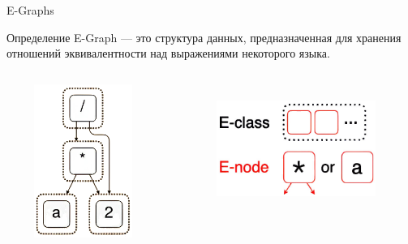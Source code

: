 \documentclass[aspectratio=169
  , xcolor={svgnames}
  , russian  %
  ]{beamer}
\begin{document}


\begin{frame}{E-Graphs}
    \begin{block}{Определение}
        E-Graph --- это структура данных, предназначенная для хранения отношений эквивалентности над выражениями некоторого языка.
    \end{block}
    
    \begin{columns}
        \begin{column}{0.5\textwidth}
            \centering
            \includegraphics[width=5cm, height=5cm]{misc/egraphs_images/egraph_1.png} %
        \end{column}
        \begin{column}{0.5\textwidth}
            \centering
            \includegraphics[width=5.2cm, height=4.2cm]{misc/egraphs_images/enodes_eclasses.jpg} %
        \end{column}
    \end{columns}

\end{frame}
\end{document}
